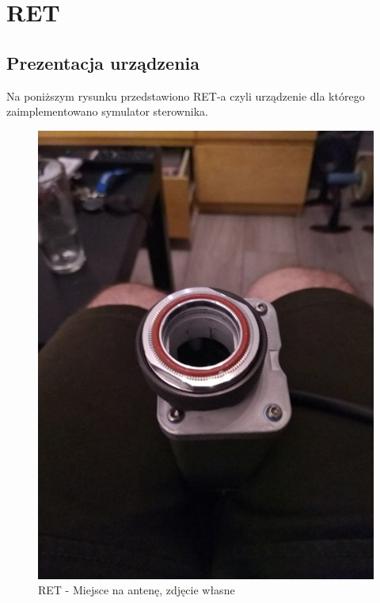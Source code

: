 \chapter{RET}
	\section{Prezentacja urządzenia}
		Na poniższym rysunku przedstawiono RET-a czyli urządzenie dla którego zaimplementowano symulator sterownika. 
		\begin{figure}[h!]
		\centering
		\includegraphics[scale=0.4]{Obrazki/RET_1.png}
		\caption{RET - Miejsce na antenę, zdjęcie własne}
		\end{figure}

